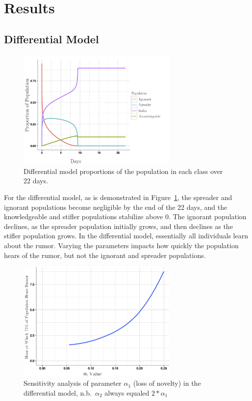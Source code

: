 \section{Results}
\label{sec:results}

\subsection{Differential Model}
\label{subsec:basicmod}

\begin{figure}[H]
\captionsetup{width=0.6\textwidth}
\centering
    \includegraphics[width=0.7\textwidth]{figures/figure1}
  \caption{Differential model proportions of the population in each class over 22 days.}
\label{fig:figure1}
\end{figure}

For the differential model, as is demonstrated in Figure~\ref{fig:figure1}, the spreader and ignorant populations become negligible by the end of the 22 days, and the knowledgeable and stifler populations stabilize above 0.
The ignorant population declines, as the spreader population initially grows, and then declines as the stifler population grows.
In the differential model, essentially all individuals learn about the rumor.
Varying the parameters impacts how quickly the population hears of the rumor, but not the ignorant and spreader populations.

\begin{figure}[H]
\captionsetup{width=0.8\textwidth}
\centering
    \includegraphics[width=0.7\textwidth]{figures/figure2}
  \caption{Sensitivity analysis of parameter $ \alpha_1 $ (loss of novelty) in the differential model, n.b.\ $ \alpha_2 $ always equaled $ 2 * \alpha_1 $}
\label{fig:figure2}
\end{figure}

